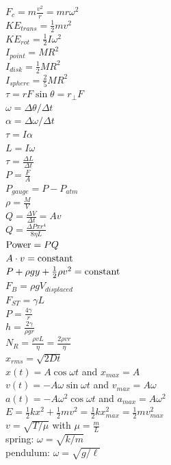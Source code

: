 \documentclass[letterpaper,addpoints,answers]{exam}
\begin{document}
\begin{multicols}{2}
 $F_c = m\frac{v^2}{r} = m r \omega^2$ \\
 $KE_{trans} = \frac{1}{2} m v^2$ \\
 $KE_{rot} = \frac{1}{2} I \omega^2$ \\
 $I_{point} = M R^2$ \\
 $I_{disk} = \frac{1}{2} M R^2$ \\
 $I_{sphere} = \frac{2}{5} M R^2$ \\
 $\tau = r F \sin\theta = r_\perp F$ \\
 $\omega = \Delta \theta/\Delta t$ \\
 $\alpha = \Delta \omega/\Delta t$ \\
 $\tau = I \alpha$ \\
 $L = I \omega$ \\
 $\tau = \frac{\Delta L}{\Delta t}$ \\
 $P = \frac{F}{A}$ \\
 $P_{gauge} = P - P_{atm}$ \\
 $\rho = \frac{M}{V}$ \\
 $Q = \frac{\Delta V}{\Delta t} = A v$ \\
 $Q = \frac{\Delta P \pi r^4}{8 \eta L}$ \\
 $\hbox{Power} = P Q$ \\
 $A \cdot v = \hbox{constant}$ \\
 $P + \rho g y + \frac{1}{2} \rho v^2 = \hbox{constant}$ \\
 $F_B = \rho g V_{displaced}$ \\
 $F_{ST} = \gamma L$ \\
 $P = \frac{4 \gamma}{r}$ \\
 $h = \frac{2 \gamma}{\rho g r}$ \\
 $N_R = \frac{\rho v L}{\eta} = \frac{2 \rho v r}{\eta}$ \\
 $x_{rms} = \sqrt{2 D t}$ \\
 $x(t) = A \cos \omega t$ and $x_{max} = A$ \\
 $v(t) = - A \omega \sin \omega t$ and $v_{max} = A \omega$ \\
 $a(t) = - A \omega^2 \cos \omega t$ and $a_{max} = A \omega^2$ \\
 $E = \frac{1}{2} k x^2 + \frac{1}{2} m v^2 = \frac{1}{2} k x_{max}^2 = \frac{1}{2} m v_{max}^2$ \\
 $v = \sqrt{T/\mu}$ with $\mu = \frac{m}{L}$ \\
 spring: $\omega = \sqrt{k/m}$ \\
 pendulum: $\omega = \sqrt{g/\ell}$ \\

\end{multicols}
\end{document}
